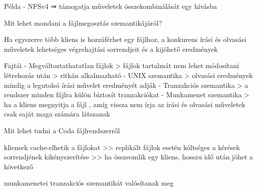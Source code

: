 \documentclass[12pt]{article}
\begin{document}
\begin{description}
                                                                    \item Példa
                                                                        - NFSv4 ⇒ támogatja műveletek összekombinálását egy hívásba
                                                                    \item  Mit lehet mondani a fájlmegosztás szemantikájáról?  
                                                                    \item Ha egyszerre több kliens is hozzáférhet egy fájlhoz, a konkurens írási és olvasási műveletek lehetséges végrehajtási sorrendjeit és a kijöhető eredmények
                                                                    \item Fajtái
                                                                        - Megváltoztathatatlan fájlok
                                                                        > fájlok tartalmát nem lehet módosítani létrehozás után
                                                                        > ritkán alkalmazható
                                                                        - UNIX szemantika
                                                                        > olvasási eredmények mindig a legutolsó írási művelet eredményét adják
                                                                        - Tranzakciós szemantika
                                                                        > a rendszer minden fájlra külön biztosít tranzakciókat
                                                                        - Munkamenet szemantika
                                                                        > ha a kliens megnyitja a fájl , amíg vissza nem írja az írási és olvasási műveletek csak saját maga számára látszanak
                                                                    \item  Mit lehet tudni a Coda fájlrendszerről 
                                                                    \item kliensek cache-elhetik a fájlokat
                                                                        >> replikált fájlok esetén költséges a kérések sorrendjének kikényszerítése
                                                                        >> ha összeomlik egy kliens, hosszu idő után jöhet a következő
                                                                    \item munkamenetei tranzakciós szemantikát valósítanak meg

\end{description}
\end{document}
